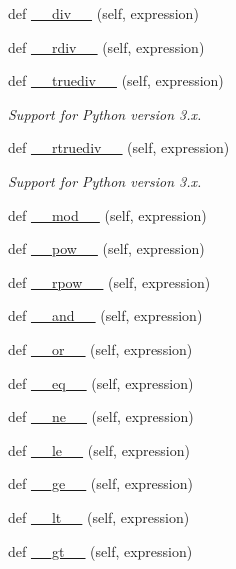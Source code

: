 \begin{DoxyCompactItemize}
def \hyperlink{classbio__expression_1_1_expression_afa01bdcad97d79b90a772e7aa5e90b18}{\+\_\+\+\_\+div\+\_\+\+\_\+} (self, expression)
\item 
def \hyperlink{classbio__expression_1_1_expression_ac63454845d5703f9bc383873f46c8e91}{\+\_\+\+\_\+rdiv\+\_\+\+\_\+} (self, expression)
\item 
def \hyperlink{classbio__expression_1_1_expression_a8c1d9e629c877626bbf2d7d976c9fcd0}{\+\_\+\+\_\+truediv\+\_\+\+\_\+} (self, expression)
\begin{DoxyCompactList}\small\item\em Support for Python version 3.\+x. \end{DoxyCompactList}\item 
def \hyperlink{classbio__expression_1_1_expression_a08e1199c83badb9657f85d05792e3f76}{\+\_\+\+\_\+rtruediv\+\_\+\+\_\+} (self, expression)
\begin{DoxyCompactList}\small\item\em Support for Python version 3.\+x. \end{DoxyCompactList}\item 
def \hyperlink{classbio__expression_1_1_expression_a38c5c89581f44ccc2fb1c9b05e4dbe94}{\+\_\+\+\_\+mod\+\_\+\+\_\+} (self, expression)
\item 
def \hyperlink{classbio__expression_1_1_expression_a24fabc1dc04263664e6e0bcf79a2a473}{\+\_\+\+\_\+pow\+\_\+\+\_\+} (self, expression)
\item 
def \hyperlink{classbio__expression_1_1_expression_a46ffa545469071f702ecf5a9f1d53fc4}{\+\_\+\+\_\+rpow\+\_\+\+\_\+} (self, expression)
\item 
def \hyperlink{classbio__expression_1_1_expression_ae2059d9b654d0f6b19d97950c715c12a}{\+\_\+\+\_\+and\+\_\+\+\_\+} (self, expression)
\item 
def \hyperlink{classbio__expression_1_1_expression_a3ee80f248ac37019c6e6e971fb0a165c}{\+\_\+\+\_\+or\+\_\+\+\_\+} (self, expression)
\item 
def \hyperlink{classbio__expression_1_1_expression_a7e3e3c9535df324c51ba278044dacc6e}{\+\_\+\+\_\+eq\+\_\+\+\_\+} (self, expression)
\item 
def \hyperlink{classbio__expression_1_1_expression_a4fe08ffee3ae7d42fe2a7c41de7caa8f}{\+\_\+\+\_\+ne\+\_\+\+\_\+} (self, expression)
\item 
def \hyperlink{classbio__expression_1_1_expression_a562b739a7ba987f448138efe3d02cd1c}{\+\_\+\+\_\+le\+\_\+\+\_\+} (self, expression)
\item 
def \hyperlink{classbio__expression_1_1_expression_ad8ea5a2d766e03bb9b2bb30799d48e4f}{\+\_\+\+\_\+ge\+\_\+\+\_\+} (self, expression)
\item 
def \hyperlink{classbio__expression_1_1_expression_a04ae5af4e606bdd5717ed0b2eca1626d}{\+\_\+\+\_\+lt\+\_\+\+\_\+} (self, expression)
\item 
def \hyperlink{classbio__expression_1_1_expression_a0bb74b47fe63f9132ce35fa9c7f6104f}{\+\_\+\+\_\+gt\+\_\+\+\_\+} (self, expression)
\end{DoxyCompactItemize}
